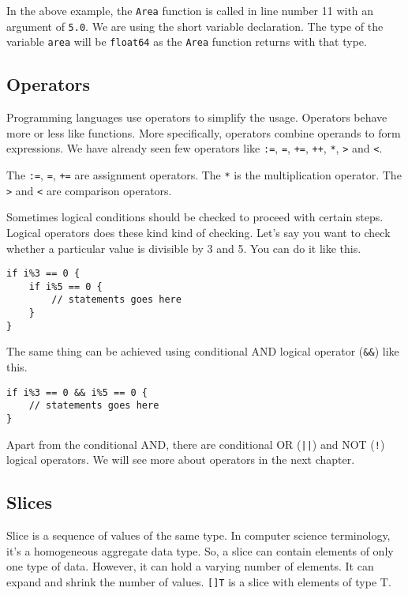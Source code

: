 In the above example, the \texttt{Area} function is called in line
number 11 with an argument of \texttt{5.0}.  We are using the short
variable declaration.  The type of the variable \texttt{area} will be
\texttt{float64} as the \texttt{Area} function returns with that type.

\subsection{Operators}

Programming languages use operators to simplify the
usage.  Operators behave more or less like functions.  More
specifically, operators combine operands to form expressions.  We have
already seen few operators
like \texttt{:=}, \texttt{=}, \texttt{+=}, \texttt{++}, \texttt{*},
\texttt{>} and \texttt{<}.

The \texttt{:=}, \texttt{=}, \texttt{+=} are assignment operators.
The \texttt{*} is the multiplication operator.  The \texttt{>}
and \texttt{<} are comparison operators.

Sometimes logical conditions should be checked to proceed with certain
steps.  Logical operators does these kind kind of checking.  Let's
say you want to check whether a particular value is divisible by 3
and 5.  You can do it like this.

\begin{lstlisting}[numbers=none]
if i%3 == 0 {
    if i%5 == 0 {
        // statements goes here
    }
}
\end{lstlisting}

The same thing can be achieved using conditional AND logical operator
(\texttt{\&\&}) like this.

\begin{lstlisting}[numbers=none]
if i%3 == 0 && i%5 == 0 {
    // statements goes here
}
\end{lstlisting}

Apart from the conditional AND, there are conditional OR (\texttt{||})
and NOT (\texttt{!}) logical operators.  We will see more about
operators in the next chapter.


\subsection{Slices}

Slice is a sequence of values of the same type.  In
computer science terminology, it's a homogeneous aggregate data type.
So, a slice can contain elements of only one type of data.  However,
it can hold a varying number of elements.  It can expand and shrink
the number of values.  \texttt{[]T} is a slice with elements of type
T.

